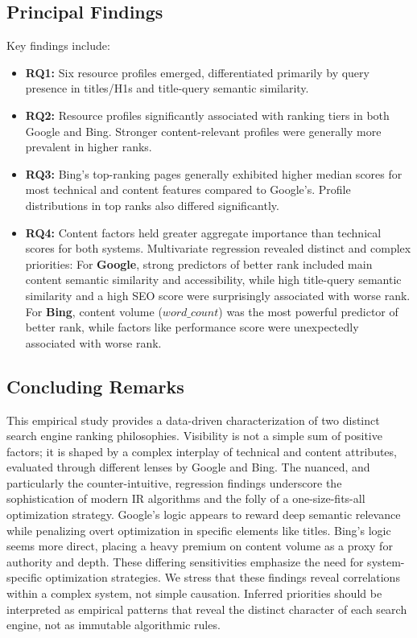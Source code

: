 \documentclass[a4paper,fleqn]{cas-sc}
\begin{document}
\subsection{Principal Findings}
\label{subsec:conclusion_summary}
Key findings include:
\begin{itemize}
    \item \textbf{RQ1:} Six resource profiles emerged, differentiated primarily by query presence in titles/H1s and title-query semantic similarity.
    \item \textbf{RQ2:} Resource profiles significantly associated with ranking tiers in both Google and Bing. Stronger content-relevant profiles were generally more prevalent in higher ranks.
    \item \textbf{RQ3:} Bing's top-ranking pages generally exhibited higher median scores for most technical and content features compared to Google's. Profile distributions in top ranks also differed significantly.
    \item \textbf{RQ4:} Content factors held greater aggregate importance than technical scores for both systems. Multivariate regression revealed distinct and complex priorities: For \textbf{Google}, strong predictors of better rank included main content semantic similarity and accessibility, while high title-query semantic similarity and a high SEO score were surprisingly associated with worse rank. For \textbf{Bing}, content volume ($word\_count$) was the most powerful predictor of better rank, while factors like performance score were unexpectedly associated with worse rank.
\end{itemize}

\subsection{Concluding Remarks}
\label{subsec:conclusion_remarks}
This empirical study provides a data-driven characterization of two distinct search engine ranking philosophies. Visibility is not a simple sum of positive factors; it is shaped by a complex interplay of technical and content attributes, evaluated through different lenses by Google and Bing. The nuanced, and particularly the counter-intuitive, regression findings underscore the sophistication of modern IR algorithms and the folly of a one-size-fits-all optimization strategy. Google's logic appears to reward deep semantic relevance while penalizing overt optimization in specific elements like titles. Bing's logic seems more direct, placing a heavy premium on content volume as a proxy for authority and depth. These differing sensitivities emphasize the need for system-specific optimization strategies. We stress that these findings reveal correlations within a complex system, not simple causation. Inferred priorities should be interpreted as empirical patterns that reveal the distinct character of each search engine, not as immutable algorithmic rules.
\end{document}

